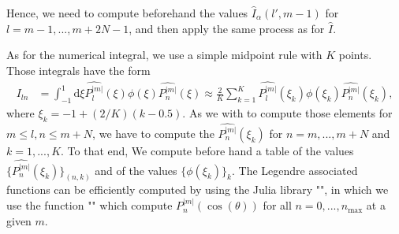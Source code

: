 \documentclass[11pt]{article}
\newcommand{\rd}{\mathrm{d}}
\newcommand{\Pnm}{P_n^{|m|}}
\newcommand{\Plm}{P_l^{|m|}}
\newcommand{\hPnm}{\widehat{\Pnm}}
\newcommand{\hPlm}{\widehat{\Plm}}
\newcommand{\hI}{\widehat{I}}
\begin{document}
Hence, we need to compute beforehand the values $\hI_{\alpha}(l',m-1)$ for $l=m-1,...,m+2N-1$, and then apply the same process as for $\hI$. 

As for the numerical integral, we use a simple midpoint rule with $K$ points. Those integrals have the form
\begin{align*}
I_{ln} &= \int_{-1}^{1} \rd \xi \hPlm(\xi) \phi(\xi) \hPnm(\xi) \approx \frac{2}{K} \sum_{k=1}^{K} \hPlm(\xi_{k}) \phi(\xi_{k}) \hPnm(\xi_{k}),
\end{align*}
where $\xi_{k} = -1 + (2/K)(k-0.5)$. As we with to compute those elements for $m \leq l,n \leq m+N$, we have to compute the $\hPnm(\xi_{k})$ for $n=m,...,m+N$ and $k=1,...,K$. To that end, We compute before hand a table of the values $\{\hPnm(\xi_{k})\}_{(n,k)}$ and of the values $\{\phi(\xi_{k})\}_{k}$. The Legendre associated functions can be efficiently computed by using the Julia library "", in which we use the function "" which compute $\Pnm(\cos(\theta))$ for all $n=0,...,n_{\max}$ at a given $m$.
\end{document}
